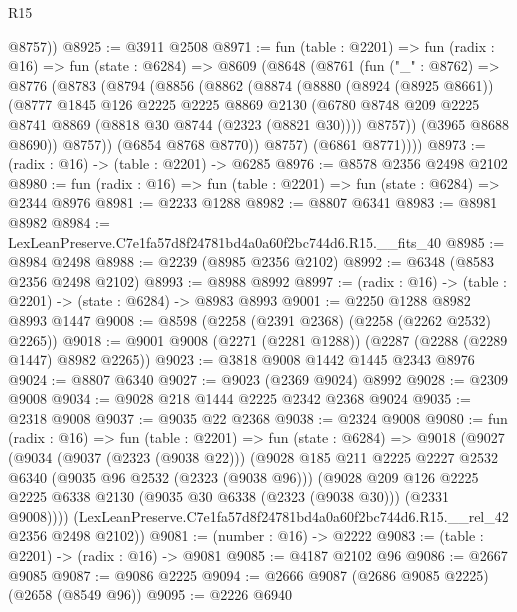 \begin{lexlean}{R15}
\begin{coremodule}
        @8757))
@8925 := @3911 @2508
@8971 := fun (table : @2201) =>
  fun (radix : @16) =>
  fun (state : @6284) =>
  @8609
    (@8648
      (@8761
        (fun ("_" : @8762) =>
        @8776
          (@8783
            (@8794
              (@8856
                (@8862
                  (@8874
                    (@8880
                      (@8924 (@8925 @8661))
                      (@8777
                        @1845
                        @126
                        @2225
                        @2225
                        @8869
                        @2130
                        (@6780 @8748 @209 @2225 @8741 @8869 (@8818 @30 @8744 (@2323 (@8821 @30))))
                        @8757))
                    (@3965 @8688 @8690))
                  @8757))
              (@6854 @8768 @8770))
            @8757)
          (@6861 @8771))))
@8973 := (radix : @16) -> (table : @2201) -> @6285
@8976 := @8578 @2356 @2498 @2102
@8980 := fun (radix : @16) => fun (table : @2201) => fun (state : @6284) => @2344 @8976
@8981 := @2233 @1288
@8982 := @8807 @6341
@8983 := @8981 @8982
@8984 := LexLeanPreserve.C7e1fa57d8f24781bd4a0a60f2bc744d6.R15.__fits_40
@8985 := @8984 @2498
@8988 := @2239 (@8985 @2356 @2102)
@8992 := @6348 (@8583 @2356 @2498 @2102)
@8993 := @8988 @8992
@8997 := (radix : @16) -> (table : @2201) -> (state : @6284) -> @8983 @8993
@9001 := @2250 @1288 @8982 @8993 @1447
@9008 := @8598 (@2258 (@2391 @2368) (@2258 (@2262 @2532) @2265))
@9018 := @9001 @9008 (@2271 (@2281 @1288)) (@2287 (@2288 (@2289 @1447) @8982 @2265))
@9023 := @3818 @9008 @1442 @1445 @2343 @8976
@9024 := @8807 @6340
@9027 := @9023 (@2369 @9024) @8992
@9028 := @2309 @9008
@9034 := @9028 @218 @1444 @2225 @2342 @2368 @9024
@9035 := @2318 @9008
@9037 := @9035 @22 @2368
@9038 := @2324 @9008
@9080 := fun (radix : @16) =>
  fun (table : @2201) =>
  fun (state : @6284) =>
  @9018
    (@9027
      (@9034
        (@9037 (@2323 (@9038 @22)))
        (@9028
          @185
          @211
          @2225
          @2227
          @2532
          @6340
          (@9035 @96 @2532 (@2323 (@9038 @96)))
          (@9028
            @209
            @126
            @2225
            @2225
            @6338
            @2130
            (@9035 @30 @6338 (@2323 (@9038 @30)))
            (@2331 @9008))))
      (LexLeanPreserve.C7e1fa57d8f24781bd4a0a60f2bc744d6.R15.__rel_42 @2356 @2498 @2102))
@9081 := (number : @16) -> @2222
@9083 := (table : @2201) -> (radix : @16) -> @9081
@9085 := @4187 @2102 @96
@9086 := @2667 @9085
@9087 := @9086 @2225
@9094 := @2666 @9087 (@2686 @9085 @2225) (@2658 (@8549 @96))
@9095 := @2226 @6940

\end{coremodule}
\end{lexlean}
